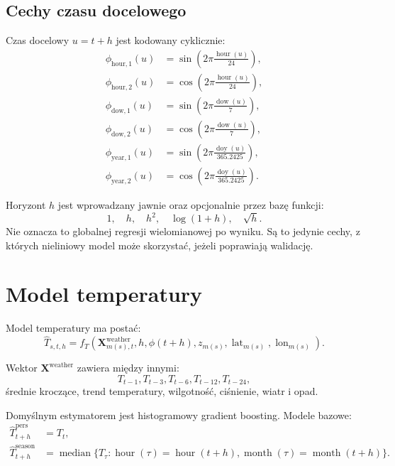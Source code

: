 \documentclass[11pt,a4paper,oneside]{article}
\newcommand{\X}{\mathbf{X}}
\begin{document}
\subsection{Cechy czasu docelowego}

Czas docelowy $u=t+h$ jest kodowany cyklicznie:
\begin{align}
  \phi_{\mathrm{hour},1}(u) &= \sin\left(2\pi\frac{\operatorname{hour}(u)}{24}\right),\\
  \phi_{\mathrm{hour},2}(u) &= \cos\left(2\pi\frac{\operatorname{hour}(u)}{24}\right),\\
  \phi_{\mathrm{dow},1}(u) &= \sin\left(2\pi\frac{\operatorname{dow}(u)}{7}\right),\\
  \phi_{\mathrm{dow},2}(u) &= \cos\left(2\pi\frac{\operatorname{dow}(u)}{7}\right),\\
  \phi_{\mathrm{year},1}(u) &= \sin\left(2\pi\frac{\operatorname{doy}(u)}{365.2425}\right),\\
  \phi_{\mathrm{year},2}(u) &= \cos\left(2\pi\frac{\operatorname{doy}(u)}{365.2425}\right).
\end{align}

Horyzont $h$ jest wprowadzany jawnie oraz opcjonalnie przez bazę funkcji:
\[
  1,\quad h,\quad h^2,\quad \log(1+h),\quad \sqrt{h}.
\]
Nie oznacza to globalnej regresji wielomianowej po wyniku. Są to jedynie cechy,
z których nieliniowy model może skorzystać, jeżeli poprawiają walidację.

\section{Model temperatury}

Model temperatury ma postać:
\begin{equation}
  \widehat T_{s,t,h}
  =
  f_T\!\left(
    \X^{\mathrm{weather}}_{m(s),t},
    h,
    \phi(t+h),
    z_{m(s)},
    \operatorname{lat}_{m(s)},
    \operatorname{lon}_{m(s)}
  \right).
  \label{eq:temperature-model}
\end{equation}

Wektor $\X^{\mathrm{weather}}$ zawiera między innymi:
\[
  T_{t-1},T_{t-3},T_{t-6},T_{t-12},T_{t-24},
\]
średnie kroczące, trend temperatury, wilgotność, ciśnienie, wiatr i opad.

Domyślnym estymatorem jest histogramowy gradient boosting. Modele bazowe:
\begin{align}
  \widehat T^{\mathrm{pers}}_{t+h} &= T_t,\\
  \widehat T^{\mathrm{season}}_{t+h} &=
  \operatorname{median}\{T_{\tau}:
  \operatorname{hour}(\tau)=\operatorname{hour}(t+h),
  \operatorname{month}(\tau)=\operatorname{month}(t+h)\}.
\end{align}
\end{document}
